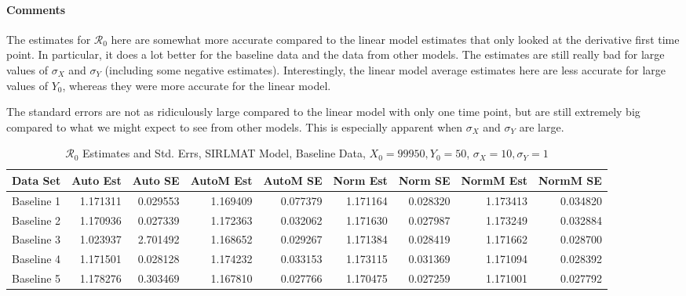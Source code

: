 \documentclass[12pt]{article}
\newcommand{\rr}{\ensuremath{\mathcal{R}_0}}
\begin{document}
\paragraph{Comments}

The estimates for $\rr$ here are somewhat more accurate compared to the linear model estimates that only looked at the derivative first time point. In particular, it does a lot better for the baseline data and the data from other models. The estimates are still really bad for large values of $\sigma_X$ and $\sigma_Y$ (including some negative estimates). Interestingly, the linear model average estimates here are less accurate for large values of $Y_0$, whereas they were more accurate for the linear model.

The standard errors are not as ridiculously large compared to the linear model with only one time point, but are still extremely big compared to what we might expect to see from other models. This is especially apparent when $\sigma_X$ and $\sigma_Y$ are large.

\begin{table}[H]
	
	\caption{$\rr$ Estimates and Std. Errs, SIRLMAT Model,
		Baseline Data, $X_0 = 99950, Y_0 = 50$, 
		$\sigma_X = 10, \sigma_Y = 1$}
	\begin{footnotesize}
		\hskip -1cm
		\begin{tabular}{l|r|r|r|r|r|r|r|r}
			\hline
			Data Set & Auto Est & Auto SE & AutoM Est & AutoM SE & Norm Est & Norm SE & NormM Est & NormM SE\\
			\hline
			Baseline 1 & 1.171311 & 0.029553 & 1.169409 & 0.077379 & 1.171164 & 0.028320 & 1.173413 & 0.034820\\
			\hline
			Baseline 2 & 1.170936 & 0.027339 & 1.172363 & 0.032062 & 1.171630 & 0.027987 & 1.173249 & 0.032884\\
			\hline
			Baseline 3 & 1.023937 & 2.701492 & 1.168652 & 0.029267 & 1.171384 & 0.028419 & 1.171662 & 0.028700\\
			\hline
			Baseline 4 & 1.171501 & 0.028128 & 1.174232 & 0.033153 & 1.173115 & 0.031369 & 1.171094 & 0.028392\\
			\hline
			Baseline 5 & 1.178276 & 0.303469 & 1.167810 & 0.027766 & 1.170475 & 0.027259 & 1.171001 & 0.027792\\
			\hline
		\end{tabular}
	\end{footnotesize}
\end{table}
\end{document}
